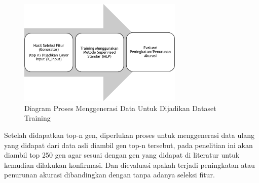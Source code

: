 \begin{figure}
	\centering
	\includegraphics[width=0.7\textwidth]
		{pics/generator2.png}
	\caption{Diagram Proses Menggenerasi Data Untuk Dijadikan Dataset Training}
	\label{fig:generator2}
\end{figure}
Setelah didapatkan top-n gen, diperlukan proses untuk menggenerasi data ulang yang didapat dari data asli diambil gen top-n tersebut, pada penelitian ini akan diambil top 250 gen agar sesuai dengan gen yang didapat di literatur untuk kemudian dilakukan konfirmasi. Dan dievaluasi apakah terjadi peningkatan atau penurunan akurasi dibandingkan dengan tanpa adanya seleksi fitur.







